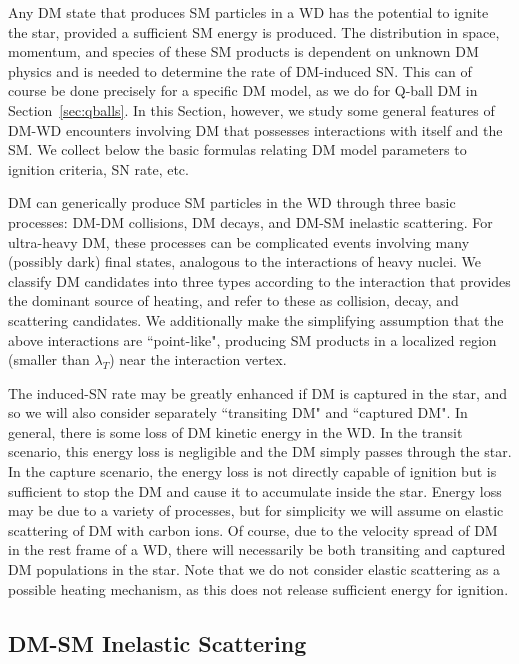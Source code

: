 Any DM state that produces SM particles in a WD has the potential to ignite the star, provided a sufficient SM energy is produced. 
The distribution in space, momentum, and species of these SM products is dependent on unknown DM physics and is needed to determine the rate of DM-induced SN. 
This can of course be done precisely for a specific DM model, as we do for Q-ball DM in Section~\ref{sec:qballs}.
In this Section, however, we study some general features of DM-WD encounters involving DM that possesses interactions with itself and the SM. 
We collect below the basic formulas relating DM model parameters to ignition criteria, SN rate, etc. 

DM can generically produce SM particles in the WD through three basic processes: DM-DM collisions, DM decays, and DM-SM inelastic scattering.
For ultra-heavy DM, these processes can be complicated events involving many (possibly dark) final states, analogous to the interactions of heavy nuclei.
We classify DM candidates into three types according to the interaction that provides the dominant source of heating, and refer to these as collision, decay, and scattering candidates.
We additionally make the simplifying assumption that the above interactions are ``point-like", producing SM products in a localized region (smaller than $\lambda_T$) near the interaction vertex.

The induced-SN rate may be greatly enhanced if DM is captured in the star, and so we will also consider separately ``transiting DM" and ``captured DM". 
In general, there is some loss of DM kinetic energy in the WD. 
In the transit scenario, this energy loss is negligible and the DM simply passes through the star.
In the capture scenario, the energy loss is not directly capable of ignition but is sufficient to stop the DM and cause it to accumulate inside the star.
Energy loss may be due to a variety of processes, but for simplicity we will assume on elastic scattering of DM with carbon ions. 
Of course, due to the velocity spread of DM in the rest frame of a WD, there will necessarily be both transiting and captured DM populations in the star. 
Note that we do not consider elastic scattering as a possible heating mechanism, as this does not release sufficient energy for ignition. 

\subsection{DM-SM Inelastic Scattering}

